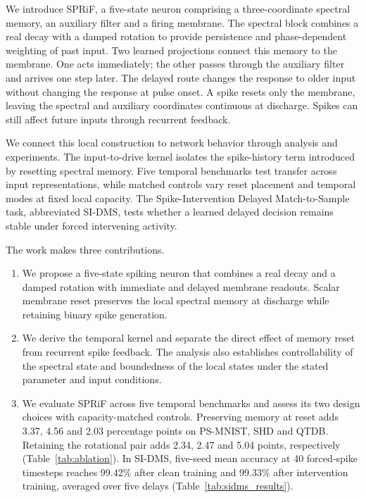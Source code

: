 \documentclass[letterpaper,journal]{IEEEtran}
\begin{document}
We introduce SPRiF, a five-state neuron comprising a three-coordinate spectral memory, an auxiliary filter and a firing membrane. The spectral block combines a real decay with a damped rotation to provide persistence and phase-dependent weighting of past input. Two learned projections connect this memory to the membrane. One acts immediately; the other passes through the auxiliary filter and arrives one step later. The delayed route changes the response to older input without changing the response at pulse onset. A spike resets only the membrane, leaving the spectral and auxiliary coordinates continuous at discharge. Spikes can still affect future inputs through recurrent feedback.

We connect this local construction to network behavior through analysis and experiments. The input-to-drive kernel isolates the spike-history term introduced by resetting spectral memory. Five temporal benchmarks test transfer across input representations, while matched controls vary reset placement and temporal modes at fixed local capacity. The Spike-Intervention Delayed Match-to-Sample task, abbreviated SI-DMS, tests whether a learned delayed decision remains stable under forced intervening activity.

The work makes three contributions.
\begin{enumerate}
\item We propose a five-state spiking neuron that combines a real decay and a damped rotation with immediate and delayed membrane readouts. Scalar membrane reset preserves the local spectral memory at discharge while retaining binary spike generation.
\item We derive the temporal kernel and separate the direct effect of memory reset from recurrent spike feedback. The analysis also establishes controllability of the spectral state and boundedness of the local states under the stated parameter and input conditions.
\item We evaluate SPRiF across five temporal benchmarks and assess its two design choices with capacity-matched controls. Preserving memory at reset adds 3.37, 4.56 and 2.03 percentage points on PS-MNIST, SHD and QTDB. Retaining the rotational pair adds 2.34, 2.47 and 5.04 points, respectively (Table~\ref{tab:ablation}). In SI-DMS, five-seed mean accuracy at 40 forced-spike timesteps reaches 99.42\% after clean training and 99.33\% after intervention training, averaged over five delays (Table~\ref{tab:sidms_results}).
\end{enumerate}
\end{document}
